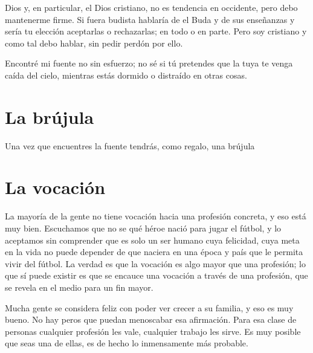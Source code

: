 Dios y, en particular, el Dios cristiano, no es tendencia en occidente, pero debo mantenerme firme. Si fuera budista hablaría de el Buda y de sus enseñanzas y sería tu elección aceptarlas o rechazarlas; en todo o en parte. Pero soy cristiano y como tal debo hablar, sin pedir perdón por ello.

Encontré mi fuente no sin esfuerzo; no sé si tú pretendes que la tuya te venga caída del cielo, mientras estás dormido o distraído en otras cosas.

\section{La brújula}

Una vez que encuentres la fuente tendrás, como regalo, una brújula

\section{La vocación}

La mayoría de la gente no tiene vocación hacia una profesión concreta, y eso está muy bien. Escuchamos que no se qué héroe nació para jugar el fútbol, y lo aceptamos sin comprender que es solo un ser humano cuya felicidad, cuya meta en la vida no puede depender de que naciera en una época y país que le permita vivir del fútbol. La verdad es que la vocación es algo mayor que una profesión; lo que sí puede existir es que se encauce una vocación a través de una profesión, que se revela en el medio para un fin mayor.

Mucha gente se considera feliz con poder ver crecer a su familia, y eso es muy bueno. No hay peros que puedan menoscabar esa afirmación. Para esa clase de personas cualquier profesión les vale, cualquier trabajo les sirve. Es muy posible que seas una de ellas, es de hecho lo inmensamente más probable.

